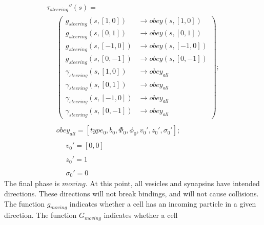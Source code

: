 \documentclass{acm_proc_article-sp}
\begin{document}
\begin{displaymath} \begin{array}{l}
\tau_{steering}''(s) = \\
\hspace{16pt} \left( \begin{array}{ll} g_{steering}(s, [1, 0]) & \rightarrow obey(s, [1, 0]) \\
                                       g_{steering}(s, [0, 1]) & \rightarrow obey(s, [0, 1]) \\
                                       g_{steering}(s, [-1, 0]) & \rightarrow obey(s, [-1, 0]) \\
                                       g_{steering}(s, [0, -1]) & \rightarrow obey(s, [0, -1]) \\
                                       \gamma_{steering}(s, [1, 0]) & \rightarrow obey_{all} \\
                                       \gamma_{steering}(s, [0, 1]) & \rightarrow obey_{all} \\
                                       \gamma_{steering}(s, [-1, 0]) & \rightarrow obey_{all} \\
                                       \gamma_{steering}(s, [0, -1]) & \rightarrow obey_{all} \end{array} \right); \\
\\
\hspace{16pt} obey_{all} = [type_0, b_0, \Phi_0, \phi_0, v_0', z_0', \sigma_0']; \\
\\
\hspace{16pt} \hspace{16pt} v_0' = [0, 0] \\
\\
\hspace{16pt} \hspace{16pt} z_0' = 1 \\
\\
\hspace{16pt} \hspace{16pt} \sigma_0' = 0
\end{array} \end{displaymath}
The final phase is $moving$.  At this point, all
vesicles and synapsins have intended directions.
These directions will not break bindings, and 
will not cause collisions.  The function
$g_{moving}$ indicates whether a cell has an 
incoming particle in a given direction.  The
function $G_{moving}$ indicates whether a cell
\end{document}

